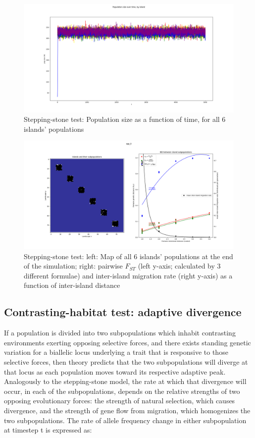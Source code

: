 ﻿\documentclass{article}
\begin{document}
\begin{figure}[h!]
\includegraphics[width=175mm]{./img/validation/stepping_stone/pop_size_over_time.png}
\caption{Stepping-stone test: Population size as a function of time, for all 6 islands' populations}
\end{figure}

\begin{figure}[h!]
\includegraphics[width=175mm]{./img/validation/stepping_stone/pop_plot_and_Fst_and_mig_rate_plot.png}
        \caption{Stepping-stone test: left: Map of all 6 islands' populations at the end of the simulation; right: pairwise $F_{ST}$ (left y-axis; calculated by 3 different formulae) and inter-island migration rate (right y-axis) as a function of inter-island distance}
\end{figure}


\subsection{Contrasting-habitat test: adaptive divergence}
If a population is divided into two subpopulations which inhabit contrasting
environments exerting opposing selective forces, and there exists standing genetic
variation for a biallelic locus underlying a trait that is responsive to those
selective forces, then theory predicts that the two subpopulations will diverge at
that locus as each population moves toward its respective adaptive peak. Analogously
to the stepping-stone model, the rate at which that divergence will occur,
in each of the subpopulations, depends on the relative strengths
of two opposing evolutionary forces: the strength of natural selection,
which causes divergence, and the strength of gene flow from migration,
which homogenizes the two subpopulations. The rate of allele frequency change
in either subpopulation at timestep t is expressed as:
\end{document}
